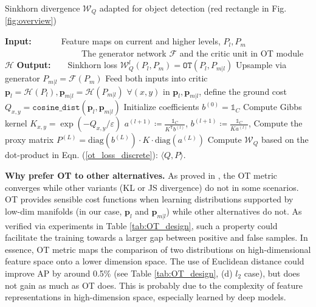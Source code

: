 \documentclass{article} \usepackage{iclr2019_conference,times}
\begin{document}
\begin{algorithm}
	\caption{Sinkhorn divergence $\mathcal{W}_{Q} $ adapted for object detection (red rectangle in Fig.\ref{fig:overview})}\label{algorithm}
	\begin{algorithmic}[H]\Statex 
		\textbf{Input:}~~~~~~~Feature maps on current and higher levels, $P_l, P_m$ 
		\Statex~~~~~~~~~~~~~~~~~~The generator network $\mathcal{F}$ and the critic unit in OT module $\mathcal{H}$
		\Statex \textbf{Output:}~~~~Sinkhorn loss $\mathcal{W}_{Q}^{l}(P_l, P_m)=\texttt{OT}(P_{l}, P_{m|l})$ \medskip
		\State Upsample via generator $P_{m|l} = \mathcal{F}(P_m)$
		\State Feed both inputs into critic $\bm{p}_l = \mathcal{H}(P_l), \bm{p}_{m|l} = \mathcal{H}(P_{m|l})$ 
		\State $\forall (x,y)$ in $\bm{p}_{l}, \bm{p}_{m|l}$, define the ground cost $Q_{x,y} =\texttt{cosine\_dist}(\bm{p}_{l}, \bm{p}_{m|l})$ 
		\medskip
		\Statex Initialize coefficients $b^{(0)} = \mathds{1}_{C}$
		\Statex Compute Gibbs kernel $K_{x,y}=\exp(-Q_{x,y} / \varepsilon)$     
		  
		\State $a^{(l+1)} \coloneqq \frac{ \mathds{1}_{C} }{K^{\mathsf{T}} b^{(l)}}$,  
		$b^{(l+1)} \coloneqq \frac{ \mathds{1}_{C} }{K^{} a^{(l)}}$, 
		\EndFor
		\State Compute the proxy matrix $P^{(L)} = \text{diag}(b^{(L)}) \cdot K \cdot \text{diag}(a^{(L)})$
		\State Compute $\mathcal{W}_{Q}$ based on the dot-product in Eqn. (\ref{ot_loss_discrete}): $\langle  Q, P\rangle$.
	\end{algorithmic}
\end{algorithm}








\textbf{Why prefer OT to other alternatives.}    
As proved in \citep{arjovsky2017_wgan}, the OT metric converges while other variants (KL or JS divergence) do not in some scenarios. 
OT provides sensible cost functions when learning distributions supported by low-dim manifolds (in our case, $\bm{p}_l$ and $\bm{p}_{m|l}$) while other alternatives do not.  As verified via experiments in Table \ref{tab:OT_design}, such a property could facilitate the training towards a larger gap between positive and false samples.
In essence, OT metric maps the comparison of two distributions on high-dimensional feature space onto a lower dimension space. The use of Euclidean distance could improve AP by around 0.5\% (see Table \ref{tab:OT_design}, (d) $l_2$ case), but does not gain as much as OT does. This is probably due to the complexity of feature representations in high-dimension space, especially learned by deep models.
\end{document}
